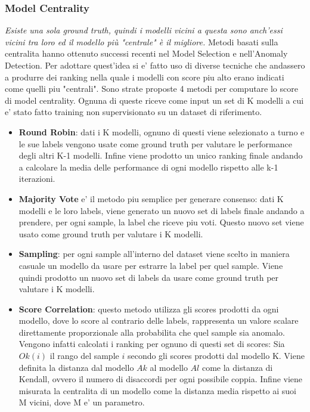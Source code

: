 \subsubsection{Model Centrality}
\textit{Esiste una sola ground truth, quindi i modelli vicini a questa sono anch'essi vicini tra loro ed il modello più "centrale" è il migliore.}
Metodi basati sulla centralita hanno ottenuto successi recenti nel Model Selection e nell'Anomaly Detection. 
Per adottare quest'idea si e' fatto uso di diverse tecniche che andassero a produrre dei ranking nella quale i modelli con score piu alto erano indicati come quelli piu "centrali".
Sono strate proposte 4 metodi per computare lo score di model centrality. Ognuna di queste riceve come input un set di K modelli a cui e' stato fatto training non supervisionato su un dataset di riferimento. 
\begin{itemize}
\item \textbf{Round Robin}: dati i K modelli, ognuno di questi viene selezionato a turno e le sue labels vengono usate come ground truth per valutare le performance degli altri K-1 modelli. Infine viene prodotto un unico ranking finale andando a calcolare la media delle performance di ogni modello rispetto alle k-1 iterazioni. 
\item \textbf{Majority Vote} e' il metodo piu semplice per generare consenso: dati K modelli e le loro labels, viene generato un nuovo set di labels finale andando a prendere, per ogni sample, la label che riceve piu voti. Questo nuovo set viene usato come ground truth per valutare i K modelli.
\item \textbf{Sampling}: per ogni sample all'interno del dataset viene scelto in maniera casuale un modello da usare per estrarre la label per quel sample. Viene quindi prodotto un nuovo set di labels da usare come ground truth per valutare i K modelli.
\item \textbf{Score Correlation}: questo metodo utilizza gli scores prodotti da ogni modello, dove lo score al contrario delle labels, rappresenta un valore scalare direttamente proporzionale alla probabilita che quel sample sia anomalo. Vengono infatti calcolati i ranking per ognuno di questi set di scores: Sia $Ok(i)$ il rango del sample $i$ secondo gli scores prodotti dal modello K. Viene definita la distanza dal modello $Ak$ al modello $Al$ come la distanza di Kendall, ovvero il numero di disaccordi per ogni possibile coppia. Infine viene misurata la centralita di un modello come la distanza media rispetto ai suoi M vicini, dove M e' un parametro.
\end{itemize}

